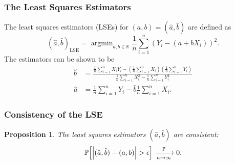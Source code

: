 \documentclass[letterpaper, reqno]{amsart}
\newtheorem{prop}{Proposition}[section]
\numberwithin{equation}{section}
\newcommand{\ddfrac}[2]{\frac{\displaystyle #1}{\displaystyle #2}}
\newcommand{\Prob}[1]{\mathbb{P}\mleft[#1\mright]}
\newcommand{\R}{\mathbb{R}}  %
\newcommand{\sumi}[2]{\sum_{#1=1}^{#2}}
\newcommand{\avg}[2]{\frac{1}{#2}\sumi{#1}{#2}}
\newcommand{\Plim}{\xrightarrow[n \to \infty]{\mathbb{P}}}
\DeclareMathOperator*{\argmin}{argmin}
\begin{document}
\subsubsection{The Least Squares Estimators}
The least squares estimators (LSEs) for $(a, b) = (\hat{a}, \hat{b})$ are defined as 
\[ (\hat{a}, \hat{b})_\mathrm{LSE} = \argmin_{a, b \in \R} \avg{i}{n}{(Y_i - (a + bX_i))^2}. \]
The estimators can be shown to be %
\begin{align*}
  \hat{b} &= \ddfrac{\avg{i}{n}{X_iY_i} - \left(\avg{i}{n}{X_i}\right)\left(\avg{i}{n}{Y_i}\right)}
                    {\avg{i}{n}{X_i^2} - \avg{i}{n}{Y_i^2}} \\
  \hat{a} &= \avg{i}{n}{Y_i} - \hat{b}\avg{i}{n}{X_i}.
\end{align*}

\subsubsection{Consistency of the LSE}
\begin{prop}
  The least squares estimators $(\hat{a}, \hat{b})$ are consistent:
  \[  \Prob{\left|(\hat{a}, \hat{b}) - (a, b)\right| > \epsilon} \Plim 0. \]
\end{prop}
\end{document}
